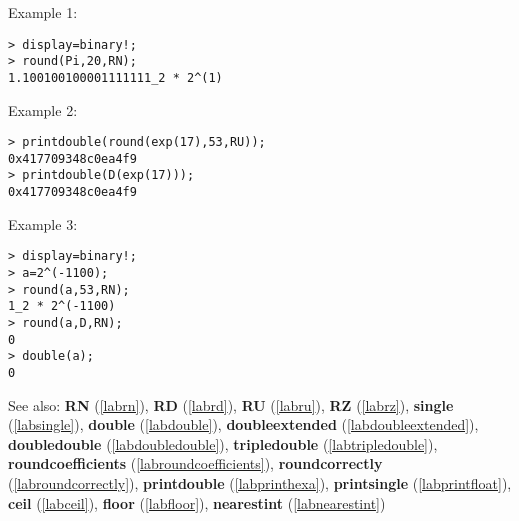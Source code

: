 \noindent Example 1: 
\begin{center}\begin{minipage}{15cm}\begin{Verbatim}[frame=single]
> display=binary!;
> round(Pi,20,RN);
1.100100100001111111_2 * 2^(1)
\end{Verbatim}
\end{minipage}\end{center}
\noindent Example 2: 
\begin{center}\begin{minipage}{15cm}\begin{Verbatim}[frame=single]
> printdouble(round(exp(17),53,RU));
0x417709348c0ea4f9
> printdouble(D(exp(17)));
0x417709348c0ea4f9
\end{Verbatim}
\end{minipage}\end{center}
\noindent Example 3: 
\begin{center}\begin{minipage}{15cm}\begin{Verbatim}[frame=single]
> display=binary!;
> a=2^(-1100);
> round(a,53,RN);
1_2 * 2^(-1100)
> round(a,D,RN);
0
> double(a);
0
\end{Verbatim}
\end{minipage}\end{center}
See also: \textbf{RN} (\ref{labrn}), \textbf{RD} (\ref{labrd}), \textbf{RU} (\ref{labru}), \textbf{RZ} (\ref{labrz}), \textbf{single} (\ref{labsingle}), \textbf{double} (\ref{labdouble}), \textbf{doubleextended} (\ref{labdoubleextended}), \textbf{doubledouble} (\ref{labdoubledouble}), \textbf{tripledouble} (\ref{labtripledouble}), \textbf{roundcoefficients} (\ref{labroundcoefficients}), \textbf{roundcorrectly} (\ref{labroundcorrectly}), \textbf{printdouble} (\ref{labprinthexa}), \textbf{printsingle} (\ref{labprintfloat}), \textbf{ceil} (\ref{labceil}), \textbf{floor} (\ref{labfloor}), \textbf{nearestint} (\ref{labnearestint})
